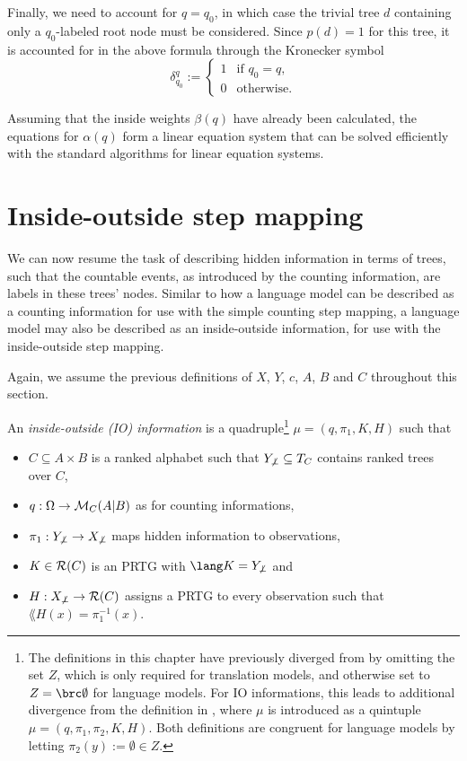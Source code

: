 Finally, we need to account for $q=q_0$, in which case the trivial tree $d$ containing only a $q_0$-labeled root node must be considered. Since $p(d)=1$ for this tree, it is accounted for in the above formula through the Kronecker symbol
\[
 \delta_{q_0}^q := \begin{cases}
  1 & \text{if } q_0 = q, \\
  0 & \text{otherwise}.
 \end{cases}
\]

Assuming that the inside weights $\beta(q)$ have already been calculated, the
equations for $\alpha(q)$ form a linear equation system that can be solved
efficiently with the standard algorithms for linear equation systems.

\section{Inside-outside step mapping}

We can now resume the task of describing hidden information in terms of trees,
such that the countable events, as introduced by the counting information, are
labels in these trees' nodes. Similar to how a language model can be described
as a counting information for use with the simple counting step mapping, a
language model may also be described as an inside-outside information, for use
with the inside-outside step mapping.

Again, we assume the previous definitions of $X$, $Y$, $c$, $A$, $B$ and $C$
throughout this section.

\begin{definition}
 An \emph{inside-outside (IO) information} is a quadruple\footnote{The definitions
 in this chapter have previously diverged from \cite{bucstuvog15} by omitting
 the set $Z$, which is only required for translation models, and otherwise set
 to $Z=\brc\emptyset$ for language models. For IO informations, this leads to
 additional divergence from the definition in \cite{bucstuvog15}, where $\mu$
 is introduced as a quintuple $\mu=(q,\pi_1,\pi_2,K,H)$. Both definitions are
 congruent for language models by letting $\pi_2(y) :=
 \emptyset\in Z$.} $\mu = (q,\pi_1,K,H)$ such that
 \begin{itemize}\setlength\itemsep{-0.3em}
  \item $C\subseteq A\times B$ is a ranked alphabet such that $Y_{\not\bot}\subseteq T_C$ contains ranked trees over $C$,
  \item $q:\Omega\to\mathcal M_C(A|B)$ as for counting informations,
  \item $\pi_1:Y_{\not\bot}\to X_{\not\bot}$ maps hidden information to observations,
  \item $K\in\mathcal R(C)$ is an PRTG with $\lang K = Y_{\not\bot}$ and
  \item $H:X_{\not\bot}\to\mathcal R(C)$ assigns a PRTG to every observation such that $\lang{H(x)} = \pi_1^{-1}(x)$.
 \end{itemize}
\end{definition}

